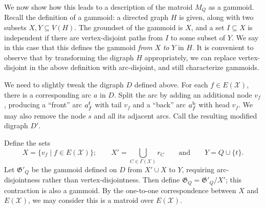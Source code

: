 \documentclass[11pt, letterpaper]{article}
\theoremstyle{definition}
\newcommand{\todo}[1]{}
\newcommand{\todo}[1]{{\color{blue}\emph{(#1)}}}
\newcommand{\grphx}{\mathcal{X}}
\newcommand{\compof}[1]{\Gamma(#1)}
\newcommand{\compx}{\compof{\grphx}}
\newcommand{\grd}{E(\grphx)}
\newcommand{\gammoid}{\mathfrak{G}}
\newcommand{\bgammoid}{\gammoid'}
\newcommand{\afront}{a^{\text{\rm f}}}
\newcommand{\aback}{a^{\text{\rm b}}}
\begin{document}
\medskip

We now show how this leads to a description of the matroid $M_Q$ as a gammoid.
Recall the definition of a gammoid: a directed graph $H$ is given, along with two subsets $X,Y \subseteq V(H)$. 
The groundset of the gammoid is $X$, and a set $I \subseteq X$ is independent if there are vertex-disjoint paths from $I$ to some subset of $Y$.
We say in this case that this defines the gammoid \emph{from} $X$ \emph{to} $Y$ in $H$.
It is convenient to observe that by transforming the digraph $H$ appropriately, we can replace vertex-disjoint in the above definition with arc-disjoint, and still characterize gammoids.



We need to slightly tweak the digraph $D$ defined above.
For each $f \in \grd$, there is a corresponding arc $a$ in $D$. Split the arc by adding an additional node $v_f$, producing a ``front'' arc $\afront_f$ with tail $v_f$ and a ``back'' arc $\aback_f$ with head $v_f$. 
We may also remove the node $s$ and all its adjacent arcs.
Call the resulting modified digraph $D'$.

Define the sets
\[ X = \{ v_f \mid f \in \grd \}; \qquad X' =  \bigcup_{C \in \compx} r_C \qquad \text{and}\qquad Y = Q \cup \{t\}. \]
Let $\bgammoid_Q$ be the gammoid defined on $D$ from $X' \cup X$ to $Y$, requiring arc-disjointness rather than vertex-disjointness.
Then define $\gammoid_Q = \bgammoid_Q /X'$; this contraction is also a gammoid.\todo{citation needed?}
By the one-to-one correspondence between $X$ and $E(\grphx)$, we may consider this is a matroid over $\grd$.
\end{document}
